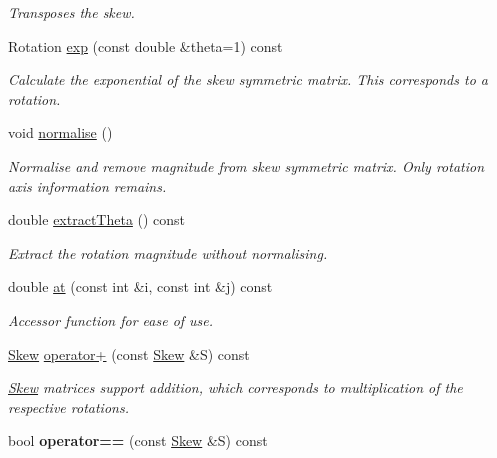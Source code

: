 \begin{DoxyCompactItemize}
\begin{DoxyCompactList}\small\item\em Transposes the skew. \end{DoxyCompactList}\item 
Rotation \hyperlink{class_skew_a18996d5ce875876b923aeeb7509dc676}{exp} (const double \&theta=1) const 
\begin{DoxyCompactList}\small\item\em Calculate the exponential of the skew symmetric matrix. This corresponds to a rotation. \end{DoxyCompactList}\item 
\hypertarget{class_skew_ab0ea378d48ef17d8c43fca04ac82bc92}{void \hyperlink{class_skew_ab0ea378d48ef17d8c43fca04ac82bc92}{normalise} ()}\label{class_skew_ab0ea378d48ef17d8c43fca04ac82bc92}

\begin{DoxyCompactList}\small\item\em Normalise and remove magnitude from skew symmetric matrix. Only rotation axis information remains. \end{DoxyCompactList}\item 
double \hyperlink{class_skew_a29af21b60bef3261c2ce26d4faa75ca0}{extract\+Theta} () const 
\begin{DoxyCompactList}\small\item\em Extract the rotation magnitude without normalising. \end{DoxyCompactList}\item 
double \hyperlink{class_skew_a40bb97a5c3554a8cd5735612f1210658}{at} (const int \&i, const int \&j) const 
\begin{DoxyCompactList}\small\item\em Accessor function for ease of use. \end{DoxyCompactList}\item 
\hypertarget{class_skew_a16082eac6e0980ff5e5ae66309474184}{\hyperlink{class_skew}{Skew} \hyperlink{class_skew_a16082eac6e0980ff5e5ae66309474184}{operator+} (const \hyperlink{class_skew}{Skew} \&S) const }\label{class_skew_a16082eac6e0980ff5e5ae66309474184}

\begin{DoxyCompactList}\small\item\em \hyperlink{class_skew}{Skew} matrices support addition, which corresponds to multiplication of the respective rotations. \end{DoxyCompactList}\item 
\hypertarget{class_skew_ad568b6a08b7a906afdb7ba94acaa4ef0}{bool {\bfseries operator==} (const \hyperlink{class_skew}{Skew} \&S) const }\label{class_skew_ad568b6a08b7a906afdb7ba94acaa4ef0}


\end{DoxyCompactItemize}
